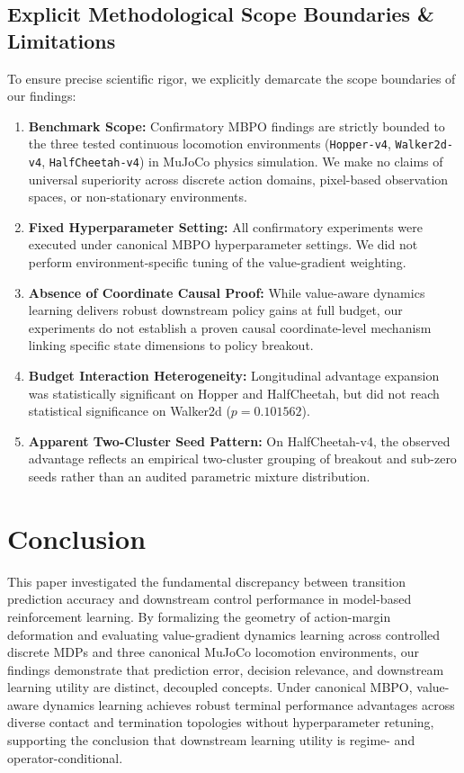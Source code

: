 \documentclass[journal,10pt,twocolumn]{IEEEtran}
\begin{document}
\subsection{Explicit Methodological Scope Boundaries \& Limitations}
\label{subsec:methodological_limitations}

To ensure precise scientific rigor, we explicitly demarcate the scope boundaries of our findings:
\begin{enumerate}
    \item \textbf{Benchmark Scope:} Confirmatory MBPO findings are strictly bounded to the three tested continuous locomotion environments (\texttt{Hopper-v4}, \texttt{Walker2d-v4}, \texttt{HalfCheetah-v4}) in MuJoCo physics simulation. We make no claims of universal superiority across discrete action domains, pixel-based observation spaces, or non-stationary environments.
    \item \textbf{Fixed Hyperparameter Setting:} All confirmatory experiments were executed under canonical MBPO hyperparameter settings. We did not perform environment-specific tuning of the value-gradient weighting.
    \item \textbf{Absence of Coordinate Causal Proof:} While value-aware dynamics learning delivers robust downstream policy gains at full budget, our experiments do not establish a proven causal coordinate-level mechanism linking specific state dimensions to policy breakout.
    \item \textbf{Budget Interaction Heterogeneity:} Longitudinal advantage expansion was statistically significant on Hopper and HalfCheetah, but did not reach statistical significance on Walker2d ($p=0.101562$).
    \item \textbf{Apparent Two-Cluster Seed Pattern:} On HalfCheetah-v4, the observed advantage reflects an empirical two-cluster grouping of breakout and sub-zero seeds rather than an audited parametric mixture distribution.
\end{enumerate}

\section{Conclusion}
\label{sec:conclusion}

This paper investigated the fundamental discrepancy between transition prediction accuracy and downstream control performance in model-based reinforcement learning. 
By formalizing the geometry of action-margin deformation and evaluating value-gradient dynamics learning across controlled discrete MDPs and three canonical MuJoCo locomotion environments, our findings demonstrate that prediction error, decision relevance, and downstream learning utility are distinct, decoupled concepts.
Under canonical MBPO, value-aware dynamics learning achieves robust terminal performance advantages across diverse contact and termination topologies without hyperparameter retuning, supporting the conclusion that downstream learning utility is regime- and operator-conditional.
\end{document}
